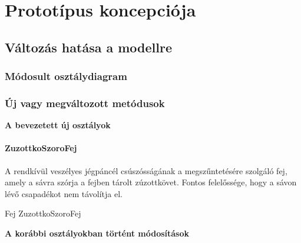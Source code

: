 \chapter{Prototípus koncepciója}
\setcounter{section}{-1}
\pagebreak
\section{Változás hatása a modellre}
\subsection{Módosult osztálydiagram}
\subsection{Új vagy megváltozott metódusok}
\textbf{A bevezetett új osztályok}
\subsubsection{ZuzottkoSzoroFej}
\begin{class-template-responsibility}
    A rendkívül veszélyes jégpáncél csúszósságának a megszűntetésére szolgáló fej, amely a sávra szórja a fejben tárolt zúzottkövet. Fontos felelőssége, hogy a sávon lévő csapadékot nem távolítja el.
\end{class-template-responsibility}
\begin{class-template-baseclass}
    Fej \baseclass ZuzottkoSzoroFej
\end{class-template-baseclass}
\begin{class-template-attribute}
\end{class-template-attribute}
\begin{class-template-method}
\end{class-template-method}

\textbf{A korábbi osztályokban történt módosítások}
